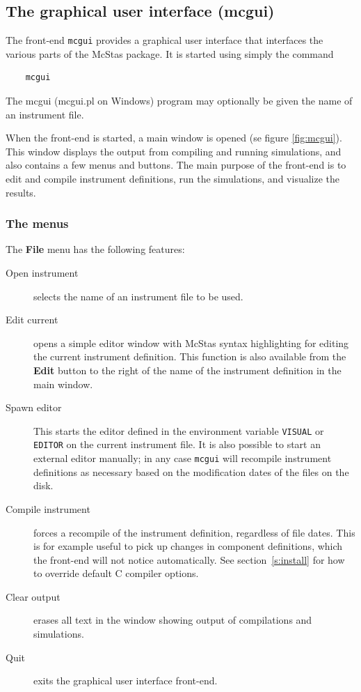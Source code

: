 \subsection{The graphical user interface (mcgui)}
\label{s:mcgui}

The front-end \verb+mcgui+ provides a graphical user interface that
interfaces the various parts of the McStas package. It is started using
simply the command
\begin{verbatim}
    mcgui
\end{verbatim}
The mcgui (mcgui.pl on Windows) program may optionally be given the name of an instrument file.

When the front-end is started, a main window is opened (se figure \ref{fig:mcgui}). This window
displays the output from compiling and running simulations, and also
contains a few menus and buttons. The main purpose of the front-end is
to edit and compile instrument definitions, run the simulations, and
visualize the results.

\subsubsection{The menus}

The {\bf File} menu has the following features:
\begin{description}
\item[Open instrument] selects the name of an instrument file to be used.
\item[Edit current] opens a simple editor window with McStas syntax
  highlighting for editing the
  current instrument definition. This function is also available from
  the {\bf Edit} button to the right of the name of the instrument definition in
  the main window.
\item[Spawn editor] This starts the editor defined in the environment
  variable \verb+VISUAL+ or \verb+EDITOR+ on the current instrument
  file. It is also possible to start an external editor manually; in any
  case \verb+mcgui+ will recompile instrument definitions as necessary based on
  the modification dates of the files on the disk.
\item[Compile instrument] forces a recompile of the instrument
  definition, regardless of file dates. This is for example useful to
  pick up changes in component definitions, which the front-end will not
  notice automatically. See section~\ref{s:install} for how to override
  default C compiler options.
\item[Clear output] erases all text in the window showing output of
  compilations and simulations.
\item[Quit] exits the graphical user interface front-end.
\end{description}

